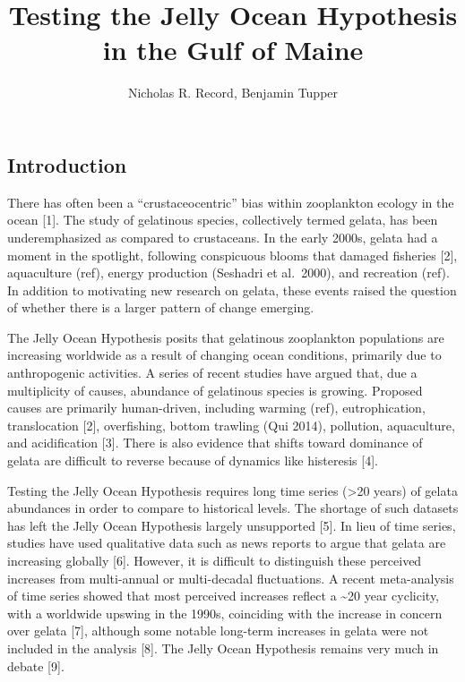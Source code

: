 \documentclass[
]{article}
\title{Testing the Jelly Ocean Hypothesis in the Gulf of Maine}
\author{Nicholas R. Record, Benjamin Tupper}
\date{}
\begin{document}
\maketitle

\subsection{Introduction}\label{introduction}

There has often been a ``crustaceocentric'' bias within zooplankton
ecology in the ocean {[}1{]}. The study of gelatinous species,
collectively termed gelata, has been underemphasized as compared to
crustaceans. In the early 2000s, gelata had a moment in the spotlight,
following conspicuous blooms that damaged fisheries {[}2{]}, aquaculture
(ref), energy production (Seshadri et al.~2000), and recreation (ref).
In addition to motivating new research on gelata, these events raised
the question of whether there is a larger pattern of change emerging.

The Jelly Ocean Hypothesis posits that gelatinous zooplankton
populations are increasing worldwide as a result of changing ocean
conditions, primarily due to anthropogenic activities. A series of
recent studies have argued that, due a multiplicity of causes, abundance
of gelatinous species is growing. Proposed causes are primarily
human-driven, including warming (ref), eutrophication, translocation
{[}2{]}, overfishing, bottom trawling (Qui 2014), pollution,
aquaculture, and acidification {[}3{]}. There is also evidence that
shifts toward dominance of gelata are difficult to reverse because of
dynamics like histeresis {[}4{]}.

Testing the Jelly Ocean Hypothesis requires long time series
(\textgreater20 years) of gelata abundances in order to compare to
historical levels. The shortage of such datasets has left the Jelly
Ocean Hypothesis largely unsupported {[}5{]}. In lieu of time series,
studies have used qualitative data such as news reports to argue that
gelata are increasing globally {[}6{]}. However, it is difficult to
distinguish these perceived increases from multi-annual or multi-decadal
fluctuations. A recent meta-analysis of time series showed that most
perceived increases reflect a \textasciitilde20 year cyclicity, with a
worldwide upswing in the 1990s, coinciding with the increase in concern
over gelata {[}7{]}, although some notable long-term increases in gelata
were not included in the analysis {[}8{]}. The Jelly Ocean Hypothesis
remains very much in debate {[}9{]}.
\end{document}
